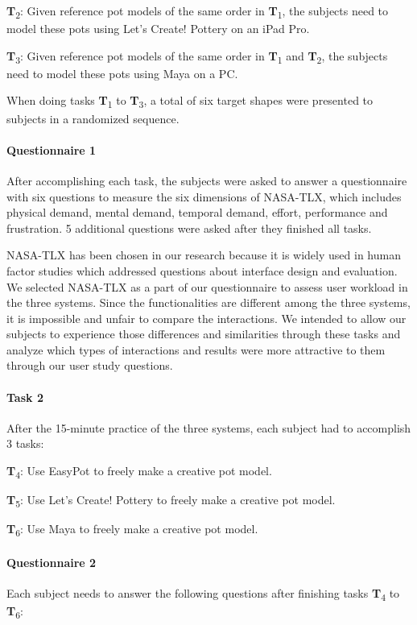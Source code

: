\documentclass{svjour3}                     %
\begin{document}
\textbf{T}\textsubscript{2}: Given reference pot models of the same order in \textbf{T}\textsubscript{1}, the subjects need to model these pots using Let's Create! Pottery on an iPad Pro.

\textbf{T}\textsubscript{3}: Given reference pot models of the same order in \textbf{T}\textsubscript{1} and \textbf{T}\textsubscript{2}, the subjects need to model these pots using Maya on a PC.


When doing tasks \textbf{T}\textsubscript{1} to \textbf{T}\textsubscript{3}, a total of six target shapes were presented to subjects in a randomized sequence.

\paragraph{Questionnaire 1} After accomplishing each task, the subjects were asked to answer a questionnaire with six questions to measure the six dimensions of NASA-TLX, which includes physical demand, mental demand, temporal demand, effort, performance and frustration. 5 additional questions were asked after they finished all tasks.

NASA-TLX has been chosen in our research because it is widely used in human factor studies which addressed questions about interface design and evaluation.\cite{hart2006nasa} We selected NASA-TLX as a part of our questionnaire to assess user workload in the three systems. Since the functionalities are different among the three systems, it is impossible and unfair to compare the interactions. We intended to allow our subjects to experience those differences and similarities through these tasks and analyze which types of interactions and results were more attractive to them through our user study questions.

\paragraph{Task 2} After the 15-minute practice of the three systems, each subject had to accomplish 3 tasks:

\textbf{T}\textsubscript{4}: Use EasyPot to freely make a creative pot model.

\textbf{T}\textsubscript{5}: Use Let's Create! Pottery to freely make a creative pot model.

\textbf{T}\textsubscript{6}: Use Maya to freely make a creative pot model.

\paragraph{Questionnaire 2} Each subject needs to answer the following questions after finishing tasks \textbf{T}\textsubscript{4} to \textbf{T}\textsubscript{6}:
\end{document}
